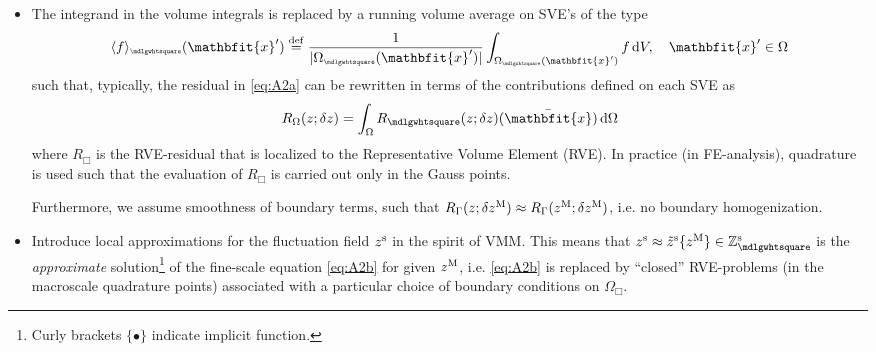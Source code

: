 \documentclass[12pt,a4paper]{article}
\renewcommand{\ta}[1]{\mathbfit{#1}}
\renewcommand{\Box}{\mdlgwhtsquare}
\DeclarePairedDelimiter{\homgen}{\langle}{\rangle_\rve}
\newcommand{\rve}{
  {\mathchoice
   {\mbox{\scalebox{0.67}{$\Box$}}}
   {\mbox{\scalebox{0.67}{$\Box$}}}
   {\mbox{\scalebox{0.5}{$\Box$}}}
   {\mbox{\scalebox{0.375}{$\Box$}}}
  }
}
\begin{document}
\begin{itemize}
\item The integrand in the volume integrals is replaced by a running volume average on SVE's of the type
\begin{equation}
    \homgen{ f }(\ta{x}') \defeq \frac{1}{|\Omega_\rve(\ta{x}')|} \int_{\Omega_\rve(\ta{x}')} f \dif V, \quad \ta{x}'\in\Omega
\label{eq:A105}
\end{equation}
such that, typically, the residual in \eqref{eq:A2a} can be rewritten in terms of the contributions defined on each SVE as
\begin{align}
\label{eq:A106} R_\Omega(z;\delta z) = \int_\Omega R_\Box(z;\delta z)(\bar{\ta x})\dif\Omega
\end{align}
where $R_\Box$ is the RVE-residual that is localized to the Representative Volume Element (RVE).
In practice (in FE-analysis), quadrature is used such that the evaluation of $R_\Box$ is carried out only in the Gauss points.

Furthermore, we assume smoothness of boundary terms, such that $R_\Gamma(z; \delta z^{\mathrm{M}}) \approx R_\Gamma(z^{\mathrm{M}};\delta z^{\mathrm{M}})$, i.e. no boundary homogenization.

\item Introduce local approximations for the fluctuation field $z^{\mathrm{s}}$ in the spirit of VMM.
This means that $z^\fluct \approx \tilde{z}^\fluct\{z^\macro\}\in\set{Z}_\Box^{\fluct}$ is the \emph{approximate} solution\footnote{Curly brackets $\{\bullet\}$ indicate implicit function.} of the fine-scale equation \eqref{eq:A2b} for given $z^{\mathrm{M}}$, i.e. \eqref{eq:A2b} is replaced by ``closed'' RVE-problems (in the macroscale quadrature points) associated with a particular choice of boundary conditions on $\Omega_\Box$.
\end{itemize}
\end{document}
